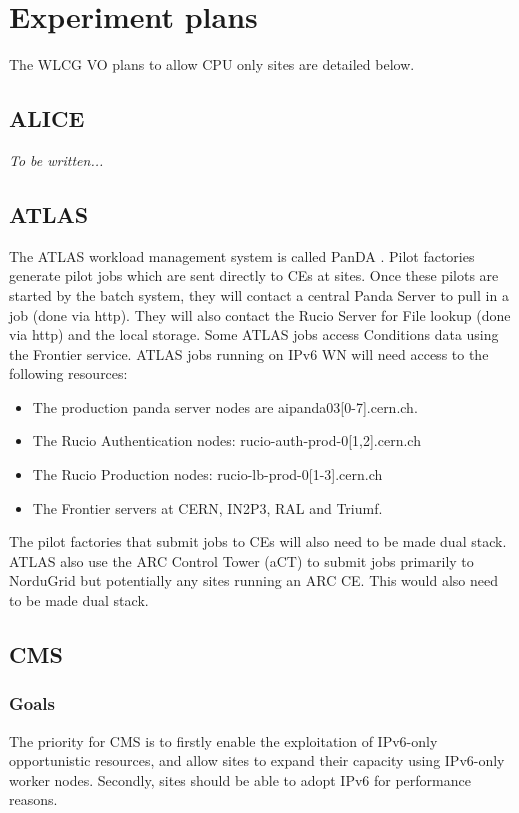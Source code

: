 \section{Experiment plans}
The WLCG VO plans to allow CPU only sites are detailed below.  

\subsection{ALICE}
\emph{To be written...}

\subsection{ATLAS}
The ATLAS workload management system is called PanDA \cite{Panda}.  Pilot factories generate pilot jobs which are sent directly to CEs at sites.  Once these pilots are started by the batch system, they will contact a central Panda Server to pull in a job (done via http).  They will also contact the Rucio Server for File lookup (done via http) and the local storage.  Some ATLAS jobs access Conditions data using the Frontier service. ATLAS jobs running on IPv6 WN will need access to the following resources:
\begin{itemize}
\item The production panda server nodes are aipanda03[0-7].cern.ch.

\item The Rucio Authentication nodes: rucio-auth-prod-0[1,2].cern.ch

\item The Rucio Production nodes: rucio-lb-prod-0[1-3].cern.ch

\item The Frontier servers at CERN, IN2P3, RAL and Triumf.

\end{itemize}  

The pilot factories that submit jobs to CEs will also need to be made dual stack.  ATLAS also use the ARC Control Tower (aCT) to submit jobs primarily to NorduGrid but potentially any sites running an ARC CE.  This would also need to be made dual stack.


\subsection{CMS}
\subsubsection{Goals}
The priority for CMS is to firstly enable the exploitation of IPv6-only opportunistic resources, and allow sites to expand their capacity using IPv6-only worker nodes. Secondly, sites should be able to adopt IPv6 for performance reasons.

